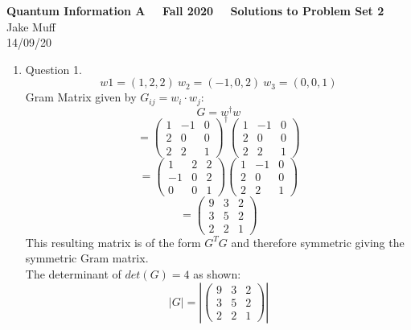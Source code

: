 \documentclass[12pt]{article}
\begin{document}
\normalsize

\baselineskip 14pt

\begin{center}
{\Large {\bf Quantum Information A \ \ Fall 2020 \ \  Solutions to Problem Set 2}}
\\
\large{Jake Muff}
\\
14/09/20
\end{center}

\bigskip



\begin{enumerate}

\item Question 1.
\\
$$ w1=(1,2,2) \ w_2=(-1,0,2) \ w_3=(0,0,1) $$
Gram Matrix given by $G_{ij} = w_i \cdot w_j $:
$$ G = w^\dagger w $$
$$ = \left( \begin{array}{ccc} 1 & -1 &0 \\ 2 & 0 &0 \\ 2 &2&1 \end{array} \right)^\dagger \left( \begin{array}{ccc} 1 & -1 &0 \\ 2 & 0 &0 \\ 2 &2&1 \end{array} \right) $$
$$ = \left( \begin{array}{ccc} 1 & 2 &2 \\ -1 & 0 &2 \\ 0 &0&1 \end{array} \right)\left( \begin{array}{ccc} 1 & -1 &0 \\ 2 & 0 &0 \\ 2 &2&1 \end{array} \right) $$
$$ = \left( \begin{array}{ccc} 9 & 3 &2 \\ 3 & 5 &2 \\ 2 &2&1 \end{array} \right)$$
This resulting matrix is of the form $G^T G$ and therefore symmetric giving the symmetric Gram matrix. 
\\
The determinant of $det(G) = 4$ as shown:
$$ |G| = | \left( \begin{array}{ccc} 9 & 3 &2 \\ 3 & 5 &2 \\ 2 &2&1 \end{array} \right) |$$

\end{enumerate}
\end{document}
